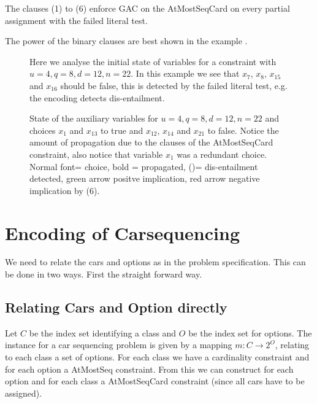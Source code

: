 \documentclass[]{llncs}
\newcommand{\AtMostSeqCard}{AtMostSeqCard }
\begin{document}
\begin{conjecture}
    The clauses (1) to (6) enforce GAC on the \AtMostSeqCard on every
    partial assignment with the failed literal test. 
\end{conjecture}

%

The power of the binary clauses are best shown in the example 
\cite{Siala12}.


\begin{figure}
\centering 
\caption{Here we analyse the initial state of variables for a constraint
    with $u=4,q=8,d=12,n=22$. In this example we see that $x_{7}$,
    $x_{8}$, $x_{15}$ and $x_{16}$ should be false, this is detected by
    the failed literal test, e.g. the encoding detects dis-entailment.}

\end{figure}

\begin{figure}
\centering 
\caption{State of the auxiliary variables for $u=4,q=8,d=12,n=22$ and
    choices $x_{1}$ and $x_{13}$ to true and $x_{12}$, $x_{14}$ and
    $x_{21}$ to false. Notice the amount of propagation due to the
    clauses of the \AtMostSeqCard constraint, also notice that variable
$x_{1}$ was a redundant choice. Normal font= choice, bold = propagated,
()= dis-entailment detected, green arrow positve implication, red arrow
negative implication by (6).}

\end{figure}

\section{Encoding of Carsequencing}

We need to relate the cars and options as in the problem specification.
This can be done in two ways. First the straight forward way. 

\subsection{Relating Cars and Option directly}

Let $C$ be the index set identifying a class and $O$ be the index set
for options. The instance for a car sequencing problem is given by a
mapping $m : C\rightarrow 2^O$, relating to each class a set of options.
For each class we have a cardinality constraint and for each option a
AtMostSeq constraint. From this we can construct for each option and for
each class a \AtMostSeqCard constraint (since all cars have to be
assigned). 
\end{document}
